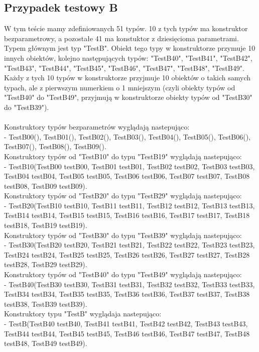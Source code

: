 \documentclass[12pt]{article}
\begin{document}
\subsection{Przypadek testowy B}
W tym teście mamy zdefiniowanych 51 typów. 10 z tych typów ma konstruktor bezparametrowy, a pozostałe 41 ma konstuktor z dziesięcioma parametrami. Typem głównym jest typ "TestB". Obiekt tego typy w konstruktorze przymuje 10 innych obiektów, kolejno następujących typów: "TestB40", "TestB41", "TestB42", "TestB43", "TestB44", "TestB45", "TestB46", "TestB47", "TestB48", "TestB49". Każdy z tych 10 typów w konstruktorze przyjmuje 10 obiektów o takich samych typach, ale z pierwszym numerkiem o 1 mniejszym (czyli obiekty typów od "TestB40" do "TestB49", przyjmują w konstruktorze obiekty typów od "TestB30" do "TestB39").\\
\\
Konstruktory typów bezparametrów wyglądają nastepująco:\\
- TestB00(), TestB01(),  TestB02(), TestB03(), TestB04(), TestB05(), TestB06(), TestB07(), TestB08(), TestB09().\\
Konstruktory typów od "TestB10" do typu "TestB19" wyglądają nastepująco:\\
- TestB10(TestB00 testB00, TestB01 testB01, TestB02 testB02, TestB03 testB03, TestB04 testB04, TestB05 testB05, TestB06 testB06, TestB07 testB07, TestB08 testB08, TestB09 testB09).\\
Konstruktory typów od "TestB20" do typu "TestB29" wyglądają nastepująco:\\
- TestB20(TestB10 testB10, TestB11 testB11, TestB12 testB12, TestB13 testB13, TestB14 testB14, TestB15 testB15, TestB16 testB16, TestB17 testB17, TestB18 testB18, TestB19 testB19).\\
Konstruktory typów od "TestB30" do typu "TestB39" wyglądają nastepująco:\\
- TestB30(TestB20 testB20, TestB21 testB21, TestB22 testB22, TestB23 testB23, TestB24 testB24, TestB25 testB25, TestB26 testB26, TestB27 testB27, TestB28 testB28, TestB29 testB29).\\
Konstruktory typów od "TestB40" do typu "TestB49" wyglądają nastepująco:\\
- TestB40(TestB30 testB30, TestB31 testB31, TestB32 testB32, TestB33 testB33, TestB34 testB34, TestB35 testB35, TestB36 testB36, TestB37 testB37, TestB38 testB38, TestB39 testB39).\\
Konstruktory typu "TestB" wyglądaja nastepująco:\\
- TestB(TestB40 testB40, TestB41 testB41, TestB42 testB42, TestB43 testB43, TestB44 testB44, TestB45 testB45, TestB46 testB46, TestB47 testB47, TestB48 testB48, TestB49 testB49).\\
\end{document}
